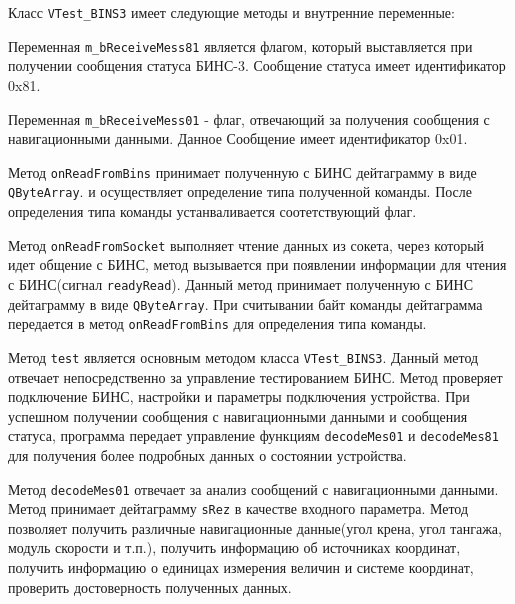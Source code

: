 Класс \texttt{VTest\_BINS3} имеет следующие методы и внутренние переменные:
\begin{enum}
	\item Переменная \texttt{m\_bReceiveMess81} является флагом, который выставляется при получении сообщения
		статуса БИНС-3. Сообщение статуса имеет идентификатор 0x81.

	\item Переменная \texttt{m\_bReceiveMess01} - флаг, отвечающий за получения сообщения с навигационными данными.
		Данное Сообщение имеет идентификатор 0x01.

	\item Метод \texttt{onReadFromBins} принимает полученную с БИНС дейтаграмму в виде \texttt{QByteArray}.
		и осуществляет определение типа полученной команды. После определения типа команды устанваливается
		соотетствующий флаг.

	\item Метод \texttt{onReadFromSocket} выполняет чтение данных из сокета, через который идет общение с БИНС,
		метод вызывается при появлении информации для чтения с БИНС(сигнал \texttt{readyRead}).
		Данный метод принимает полученную с БИНС дейтаграмму в виде \texttt{QByteArray}.
		При считывании байт команды дейтаграмма передается в метод \texttt{onReadFromBins} для определения типа
		команды.

	\item Метод \texttt{test} является основным методом класса \texttt{VTest\_BINS3}. Данный метод отвечает
		непосредственно за управление тестированием БИНС. Метод проверяет подключение БИНС, настройки и
		параметры подключения устройства. При успешном получении сообщения с навигационными данными и сообщения
		статуса, программа передает управление функциям \texttt{decodeMes01} и \texttt{decodeMes81} для
		получения более подробных данных о состоянии устройства.

	\item Метод \texttt{decodeMes01} отвечает за анализ сообщений с навигационными данными. Метод принимает
		дейтаграмму \texttt{sRez} в качестве входного параметра. Метод позволяет получить
		различные навигационные данные(угол крена, угол тангажа, модуль скорости и т.п.), получить информацию об
		источниках координат, получить информацию о единицах измерения величин и системе координат, проверить
		достоверность полученных данных.


\end{enum}
